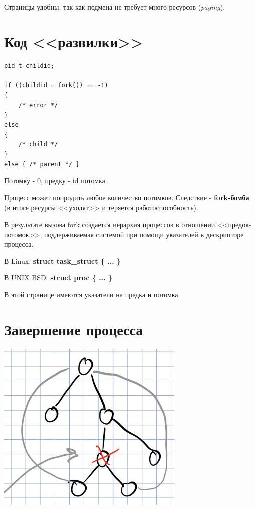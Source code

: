 \documentclass[14pt, a4paper]{article}
\begin{document}
	Страницы удобны, так как подмена не требует много ресурсов ({\it paging}).
	
	\section*{Код <<развилки>>}
	
	\begin{lstlisting}
pid_t childid;

if ((childid = fork()) == -1)
{
	/* error */
}
else
{
	/* child */
}
else { /* parent */ }
	\end{lstlisting}

	Потомку - 0, предку - id потомка.
	
	Процесс может попродить любое количество потомков. Следствие - {\bf fork-бомба} (в итоге ресурсы <<уходят>> и теряется работоспособность).
	
	В результате вызова fork создается иерархия процессов в отношении <<предок-потомок>>, поддерживаемая системой при помощи указателей в дескрипторе процесса.
	
	В Linux: {\bf struct task\_struct \{ ... \}}
	
	В UNIX BSD: {\bf struct proc \{ ... \}}
	
	В этой странице имеются указатели на предка и потомка.
	
	\section*{Завершение процесса}
	
	\includegraphics[width=\linewidth]{1}
	
\end{document}
